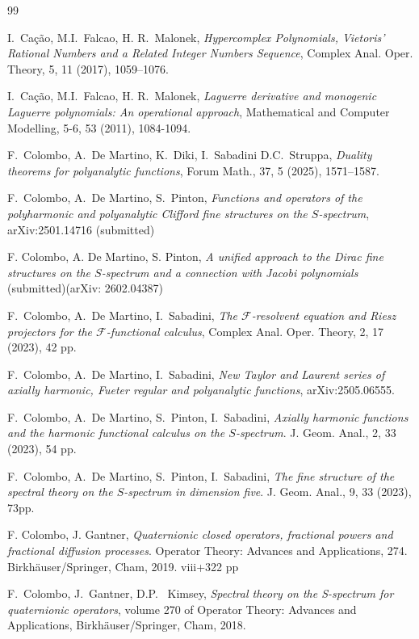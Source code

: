 \documentclass[reqno,11pt]{amsart}
\numberwithin{equation}{section}
\theoremstyle{definition}
\begin{document}
\begin{thebibliography}{99}
	
	 I.~Cação, M.I.~Falcao, H. R.~Malonek, \emph{ Hypercomplex Polynomials, Vietoris’ Rational Numbers and a Related Integer Numbers Sequence}, Complex Anal. Oper. Theory, 5, 11 (2017), 1059–1076.
	
	  I.~Cação, M.I.~Falcao, H. R.~Malonek, \emph{Laguerre derivative and monogenic Laguerre polynomials: An operational approach}, Mathematical and Computer Modelling, 5-6, 53 (2011), 1084-1094.
	
		F.~Colombo, A.~De Martino, K.~Diki, I.~Sabadini D.C.~Struppa, \emph{Duality theorems for polyanalytic functions}, Forum Math., 37, 5 (2025), 1571–1587.
	
	     F.~Colombo, A.~De Martino, S.~Pinton, \emph{Functions and operators of the polyharmonic and polyanalytic Clifford fine structures on the $S$-spectrum},  arXiv:2501.14716  (submitted)
	
	
	      F. Colombo, A. De Martino, S. Pinton, \emph{ A unified approach to the Dirac fine structures on the $S$-spectrum and a connection with Jacobi polynomials} (submitted)(arXiv: 2602.04387)
	
	
	 F.~Colombo, A.~De Martino, I.~Sabadini, \emph{The $ \mathcal{F}$-resolvent equation and Riesz projectors for the $
		\mathcal{F}$-functional calculus}, Complex Anal. Oper. Theory, 2, 17 (2023), 42 pp.
		
		 F.~Colombo, A.~De Martino, I.~Sabadini, \emph{New Taylor and Laurent series of axially harmonic, Fueter regular and polyanalytic functions}, arXiv:2505.06555.
	
	
	 F.~Colombo, A.~De Martino, S.~Pinton, I.~Sabadini, \emph{Axially harmonic functions and the harmonic functional calculus on the $S$-spectrum}. J. Geom. Anal., 2, 33 (2023), 54 pp.
	
	 F.~Colombo, A.~De Martino, S.~Pinton, I.~Sabadini, \emph{The fine structure of the spectral theory on the $S$-spectrum in dimension five}. J. Geom. Anal., 9, 33 (2023), 73pp.
	
	F. Colombo, J. Gantner,
	\emph{Quaternionic closed operators, fractional powers and fractional diffusion processes}. Operator Theory: Advances and Applications, 274. Birkhäuser/Springer, Cham, 2019. viii+322 pp
	
	
	 F.~Colombo, J.~Gantner, D.P.~ Kimsey, \emph{Spectral theory on the {S}-spectrum for quaternionic operators}, volume 270 of Operator Theory: Advances and Applications, Birkh\"{a}user/Springer, Cham, 2018.
	

\end{thebibliography}
\end{document}

